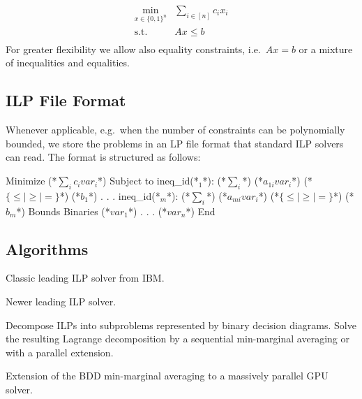\begin{equation}
    \tag{ILP}
    \begin{array}{rl}
    \min_{x \in \{0,1\}^n}
    & \sum_{i\in[n]} c_i x_i \\
    \text{s.t.}
    & Ax \leq b \\
    \end{array}
\end{equation}
For greater flexibility we allow also equality constraints, i.e.\  $Ax = b$ or a mixture of inequalities and equalities.

\subsection{ILP File Format}
\label{sec:ilp-file-format}
Whenever applicable, e.g.\ when the number of constraints can be polynomially bounded, we store the problems in an LP file format that standard ILP solvers can read.
The format is structured as follows:

{\small
\begin{fileformat}
Minimize
(*$\sum\limits_i c_i var_i$*)
Subject to
ineq_id(*${}_1$*): (*$\sum\limits_{i}$*) (*$a_{1i} var_{i}$*)  (*$\{\leq|\geq|=\}$*) (*$b_1$*)
.
.
.
ineq_id(*${}_m$*): (*$\sum\limits_{i}$*) (*$a_{mi} var_{i}$*)  (*$\{\leq|\geq|=\}$*) (*$b_m$*)
Bounds
Binaries
(*$var_1$*)
.
.
.
(*$var_n$*)
End
\end{fileformat}
}

\subsection{Algorithms}
\begin{description}[style=unboxed]
\item[CPLEX~\cite{cplex}:] Classic leading ILP solver from IBM.
\item[Gurobi~\cite{gurobi}:] Newer leading ILP solver.
\item[BDD Min-Marginal Averaging~\cite{lange2021efficient}:]
Decompose ILPs into subproblems represented by binary decision diagrams. Solve the resulting Lagrange decomposition by a sequential min-marginal averaging or with a parallel extension.
\item[Fast Discrete Optimization on GPU (FastDOG)~\cite{abbas2021fastdog}:] Extension of the BDD min-marginal averaging to a massively parallel GPU solver.
\end{description}
